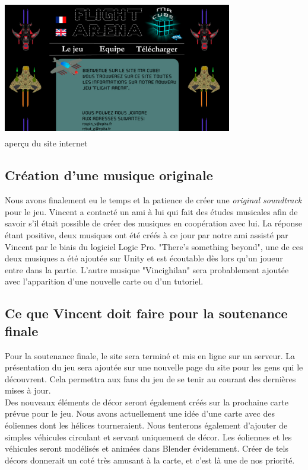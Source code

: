 \documentclass[10pt, titlepage]{report}
\begin{document}
\begin{center}
\includegraphics[height=6cm, width=10cm]{site.png}\\
aperçu du site internet
\end{center}

\subsection{Création d'une musique originale}
Nous avons finalement eu le temps et la patience de créer une \textit{original soundtrack} pour le jeu. Vincent a contacté un ami à lui qui fait des études musicales afin de savoir s'il était possible de créer des musiques en coopération avec lui. La réponse étant positive, deux musiques ont été créés à ce jour par notre ami assisté par Vincent par le biais du logiciel Logic Pro. "There's something beyond", une de ces deux musiques a été ajoutée sur Unity et est écoutable dès lors qu'un joueur entre dans la partie. L'autre musique "Vincighilan" sera probablement ajoutée avec l'apparition d'une nouvelle carte ou d'un tutoriel.

\subsection{Ce que Vincent doit faire pour la soutenance finale}
Pour la soutenance finale, le site sera terminé et mis en ligne sur un serveur. La présentation du jeu sera ajoutée sur une nouvelle page du site pour les gens qui le découvrent. Cela permettra aux fans du jeu de se tenir au courant des dernières mises à jour. \\

Des nouveaux éléments de décor seront également créés sur la prochaine carte prévue pour le jeu. Nous avons actuellement une idée d’une carte avec des éoliennes dont les hélices tourneraient. Nous tenterons également d’ajouter de simples véhicules circulant et servant uniquement de décor. Les éoliennes et les véhicules seront modélisés et animées dans Blender évidemment. Créer de tels décors donnerait un coté très amusant à la carte, et c’est là une de nos priorité. \\
\end{document}
